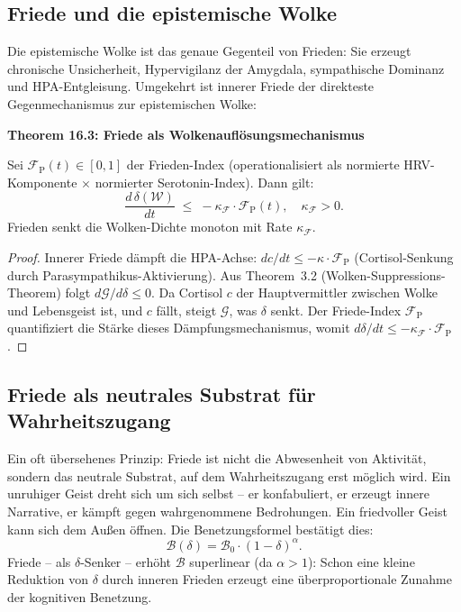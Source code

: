 ﻿\documentclass[12pt,a4paper]{report}
\theoremstyle{plain}
\theoremstyle{definition}
\theoremstyle{remark}
\begin{document}
	\subsection{Friede und die epistemische Wolke}

	Die epistemische Wolke ist das genaue Gegenteil von Frieden:
	Sie erzeugt chronische Unsicherheit, Hypervigilanz der Amygdala,
	sympathische Dominanz und HPA-Entgleisung.
	Umgekehrt ist innerer Friede der direkteste Gegenmechanismus
	zur epistemischen Wolke:

	
	\noindent\textbf{Theorem 16.3: Friede als Wolkenauflösungsmechanismus}

		Sei $\mathcal{F}_{\mathrm{P}}(t) \in [0,1]$ der Frieden-Index
		(operationalisiert als normierte HRV-Komponente
		$\times$ normierter Serotonin-Index).
		Dann gilt:
		\[
		\frac{d\,\delta(\mathcal{W})}{dt}
		\;\leq\; -\kappa_\mathcal{F} \cdot \mathcal{F}_{\mathrm{P}}(t),
		\quad \kappa_\mathcal{F} > 0.
		\]
		Frieden senkt die Wolken-Dichte monoton mit Rate $\kappa_\mathcal{F}$.


	\begin{proof}
		Innerer Friede dämpft die HPA-Achse: $dc/dt \leq -\kappa \cdot \mathcal{F}_{\mathrm{P}}$
		(Cortisol-Senkung durch Parasympathikus-Aktivierung).
		Aus Theorem~3.2 (Wolken-Suppressions-Theorem) folgt $d\mathcal{G}/d\delta \leq 0$.
		Da Cortisol $c$ der Hauptvermittler zwischen Wolke und Lebensgeist ist,
		und $c$ fällt, steigt $\mathcal{G}$, was $\delta$ senkt.
		Der Friede-Index $\mathcal{F}_{\mathrm{P}}$ quantifiziert die Stärke
		dieses Dämpfungsmechanismus, womit $d\delta/dt \leq -\kappa_\mathcal{F} \cdot \mathcal{F}_{\mathrm{P}}$. \hfill
	\end{proof}

	\subsection{Friede als neutrales Substrat für Wahrheitszugang}

	Ein oft übersehenes Prinzip: Friede ist nicht die Abwesenheit
	von Aktivität, sondern das neutrale Substrat, auf dem Wahrheitszugang
	erst möglich wird.
	Ein unruhiger Geist dreht sich um sich selbst -- er konfabuliert,
	er erzeugt innere Narrative, er kämpft gegen wahrgenommene Bedrohungen.
	Ein friedvoller Geist kann sich dem Außen öffnen.
	Die Benetzungsformel bestätigt dies:
	\[
	\mathcal{B}(\delta) = \mathcal{B}_0 \cdot (1-\delta)^\alpha.
	\]
	Friede -- als $\delta$-Senker -- erhöht $\mathcal{B}$ superlinear
	(da $\alpha > 1$): Schon eine kleine Reduktion von $\delta$ durch
	inneren Frieden erzeugt eine überproportionale Zunahme der
	kognitiven Benetzung.
\end{document}
